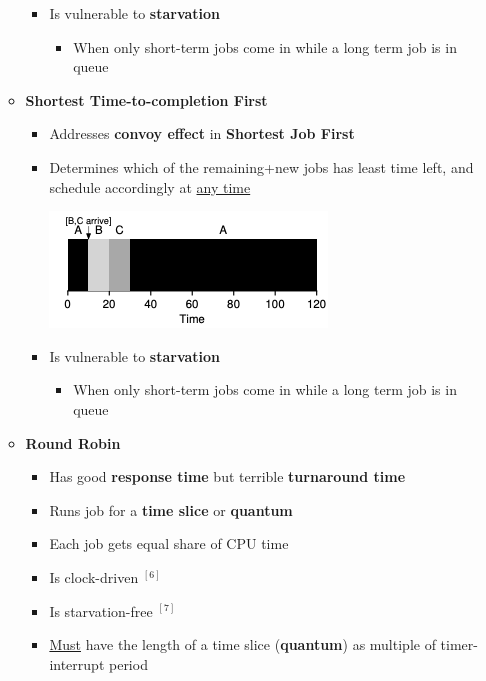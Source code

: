 \documentclass[12pt]{article}
\begin{document}
\begin{itemize}
\begin{itemize}
\begin{itemize}
            \item Is vulnerable to \textbf{starvation}
            \begin{itemize}
                \item When only short-term jobs come in while a long term job is in queue
            \end{itemize}
        \end{itemize}
        \item \textbf{Shortest Time-to-completion First}

        \begin{itemize}
            \item Addresses \textbf{convoy effect} in \textbf{Shortest Job First}
            \item Determines which of the remaining+new jobs has least time left, and
            schedule accordingly at \underline{any time}

            \bigskip

            \begin{center}
            \includegraphics[width=0.7\linewidth]{images/midterm_2_solution_7.png}
            \end{center}

            \item Is vulnerable to \textbf{starvation}
            \begin{itemize}
                \item When only short-term jobs come in while a long term job is in queue
            \end{itemize}

        \end{itemize}

        \item \textbf{Round Robin}

        \begin{itemize}
            \item Has good \textbf{response time} but terrible \textbf{turnaround time}
            \item Runs job for a \textbf{time slice} or \textbf{quantum}
            \item Each job gets equal share of CPU time
            \item Is clock-driven $^{[6]}$
            \item Is starvation-free $^{[7]}$
            \item \underline{Must} have the length of a time slice (\textbf{quantum}) as multiple of timer-interrupt period
        \end{itemize}


\end{itemize}
\end{itemize}
\end{document}
